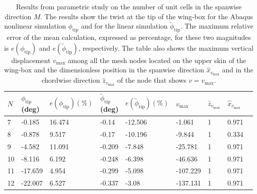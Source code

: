     \begin{table}[!htpb] %
      \centering
      \begin{tabular}{|l|l|l|l|l|l|l|l|l|}
      \hline
      $N$ & $\phi_{\mathrm{tip}}$ (deg) & $e(\phi_{\mathrm{tip}}) (\%)$ & $\tilde{\phi}_{\mathrm{tip}}$ (deg) & $e(\tilde{\phi}_{\mathrm{tip}}) (\%)$ & $v_{\mathrm{max}}$ & $\hat{z}_{v_{\mathrm{max}}}$ & $\hat{x}_{v_{\mathrm{max}}}$ \\ \hline
      7 & -0.185 & 16.474 & -0.14 & -12.506 & -1.061 & 1 & 0.971 \\ \hline
      8 & -0.878 & 9.517 & -0.17 & -10.196 & -9.844 & 1 & 0.334 \\ \hline
      9 & -4.582 & 11.091 & -0.209 & -7.848 & -25.781 & 1 & 0.971 \\ \hline
      10 & -8.116 & 6.192 & -0.248 & -6.398 & -46.636 & 1 & 0.971 \\ \hline
      11 & -17.659 & 4.954 & -0.299 & -5.098 & -107.229 & 1 & 0.971 \\ \hline
      12 & -22.007 & 6.527 & -0.337 & -3.08 & -137.131 & 1 & 0.971 \\ \hline
      \end{tabular}
      \caption[Results from parametric study on the number of unit cells in the spanwise direction]{Results from parametric study on the number of unit cells in the spanwise direction $M$. The results show the twist at the tip of the wing-box for the Abaqus nonlinear simulation $\phi_{\mathrm{tip}}$ and for the linear simulation $\tilde{\phi}_{\mathrm{tip}}$. The maximum relative error of the mean calculation, expressed as percentage, for these two magnitudes is $e(\phi_{\mathrm{tip}})$ and $e(\tilde{\phi}_{\mathrm{tip}})$, respectively. The table also shows the maximum vertical displacement $v_{\mathrm{max}}$ among all the mesh nodes located on the upper skin of the wing-box and the dimensionless position in the spanwise direction $\hat{x}_{v_{\mathrm{max}}}$ and in the chordwise direction $\hat{z}_{v_{\mathrm{max}}}$ of the node that shows $v = v_{\mathrm{max}}$.}
      \label{tab:para_N}
    \end{table}

